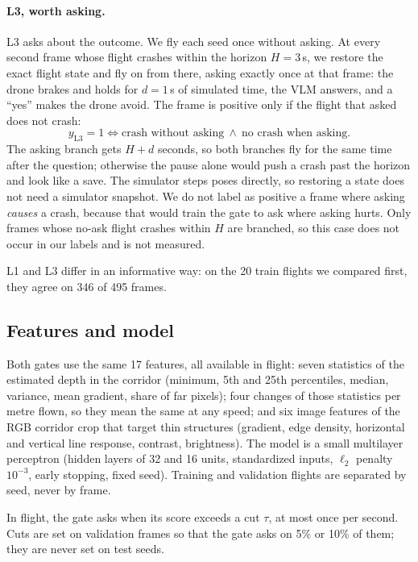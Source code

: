 \paragraph{L3, worth asking.} L3 asks about the outcome. We fly each seed once without asking. At every second
frame whose flight crashes within the horizon $H = 3$\,s, we restore the exact flight state and fly on from there,
asking exactly once at that frame: the drone brakes and holds for $d = 1$\,s of simulated time, the VLM answers,
and a ``yes'' makes the drone avoid. The frame is positive only if the flight that asked does not crash:
\[
  y_{\mathrm{L3}} = 1 \iff \text{crash without asking} \ \wedge\ \text{no crash when asking.}
\]
The asking branch gets $H + d$ seconds, so both branches fly for the same time after the question; otherwise the
pause alone would push a crash past the horizon and look like a save. The simulator steps poses directly, so
restoring a state does not need a simulator snapshot. We do not label as positive a frame where asking
\emph{causes} a crash, because that would train the gate to ask where asking hurts. Only frames whose no-ask flight
crashes within $H$ are branched, so this case does not occur in our labels and is not measured.

L1 and L3 differ in an informative way: on the 20 train flights we compared first, they agree on 346 of 495 frames.

\subsection{Features and model}
\label{sec:gate-model}

Both gates use the same 17 features, all available in flight: seven statistics of the estimated depth in the corridor
(minimum, 5th and 25th percentiles, median, variance, mean gradient, share of far pixels); four changes of those
statistics per metre flown, so they mean the same at any speed; and six image features of the RGB corridor crop that
target thin structures (gradient, edge density, horizontal and vertical line response, contrast, brightness). The model
is a small multilayer perceptron (hidden layers of 32 and 16 units, standardized inputs, $\ell_2$ penalty $10^{-3}$,
early stopping, fixed seed). Training and validation flights are separated by seed, never by frame.

In flight, the gate asks when its score exceeds a cut $\tau$, at most once per second. Cuts are set on validation
frames so that the gate asks on 5\% or 10\% of them; they are never set on test seeds.

